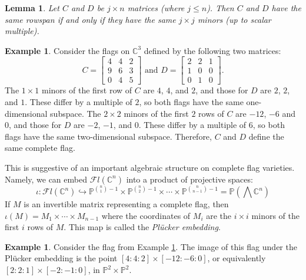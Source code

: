 \documentclass[12pt,reqno]{amsart}
\newtheorem{lemma}[theorem]{Lemma}
\theoremstyle{definition}
\newtheorem{example}[theorem]{Example}
\theoremstyle{remark}
\newcommand{\calF}{{\mathcal{F}}}
\begin{document}
\begin{lemma}
    Let $C$ and $D$ be $j\times n$ matrices (where $j\leq n$).  Then $C$ and $D$ have the same rowspan if and only if they have the same $j \times j$ minors (up to scalar multiple).
\end{lemma}

\begin{example}
\label{ex:plucker}
    Consider the flags on $\mathbb C^3$ defined by the following two matrices:
    \[
    C = \begin{bmatrix}
        4 & 4 & 2\\
        9 & 6 & 3\\
        0 & 4 & 5
    \end{bmatrix}\text{ and } D = \begin{bmatrix}
        2 & 2 & 1\\
        1 & 0 & 0\\
        0 & 1 & 0
    \end{bmatrix}.
    \]
    The $1\times 1$ minors of the first row of $C$ are $4$, $4$, and $2$, and those for $D$ are $2$, $2$, and $1$.  These differ by a multiple of $2$, so both flags have the same one-dimensional subspace.  The $2 \times 2$ minors of the first $2$ rows of $C$ are $-12$, $-6$ and $0$, and those for $D$ are $-2$, $-1$, and $0$.  These differ by a multiple of $6$, so both flags have the same two-dimensional subspace.  Therefore, $C$ and $D$ define the same complete flag.
\end{example}

This is suggestive of an important algebraic structure on complete flag varieties.  Namely, we can embed $\calF l(\mathbb C^n)$ into a product of projective spaces:
\begin{equation*}
    \iota: \calF l(\mathbb C^n) \hookrightarrow \mathbb P^{\binom{n}{1}-1} \times \mathbb P^{\binom{n}{2}-1}\times \cdots \times \mathbb P^{\binom{n}{n-1}-1} = \mathbb P\left(\bigwedge \mathbb C^n\right)
\end{equation*}
If $M$ is an invertible matrix representing a complete flag, then $\iota(M) = M_1 \times \cdots \times M_{n-1}$ where the coordinates of $M_i$ are the $i \times i$ minors of the first $i$ rows of $M$.  This map is called the \textit{Pl\"ucker embedding}. 

\begin{example}
    Consider the flag from Example \ref{ex:plucker}.  The image of this flag under the Pl\"ucker embedding is the point $[4:4:2]\times[-12:-6:0]$, or equivalently $[2:2:1] \times [-2:-1:0]$, in $\mathbb P^2 \times \mathbb P^2$.
\end{example}
\end{document}
